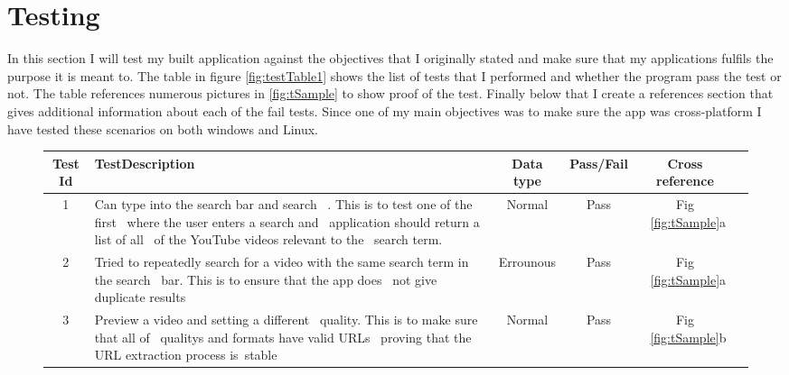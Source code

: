 \documentclass{article}
\begin{document}
\section{Testing}
In this section I will test my built application against the objectives that I originally stated and make sure
that my applications fulfils the purpose it is meant to. The table in figure \ref{fig:testTable1} shows the list
of tests that I performed and whether the program pass the test or not. The table references numerous pictures
in \ref{fig:tSample} to show proof of the test. Finally below that I create a references section that gives
additional information about each of the fail tests. Since one of my main objectives was to make sure the app
was cross-platform I have tested these scenarios on both windows and Linux.
\begin{figure}[H]
    \begin{center}
        \begin{tabular} { | c | p{5cm} | c | c | c | c |}
            \hline
            \textbf{Test Id}&         \textbf{TestDescription}         &   \textbf{Data type}   &\textbf{Pass/Fail}& \textbf{Cross reference}\\ \hline
            1               &Can type into the search bar and search   \
                             . This is to test one of the first        \
                             where the user enters a search and        \
                             application should return a list of all   \
                             of the YouTube videos relevant to the     \
                             search term.                              &      Normal            &       Pass       & Fig ~\ref{fig:tSample}a \\ \hline
            2               &Tried to repeatedly search for a video
                             with the same search term in the search   \
                             bar. This is to ensure that the app does  \
                             not give duplicate results                &      Errounous         &       Pass       & Fig ~\ref{fig:tSample}a \\ \hline
            3               &Preview a video and setting a different   \
                             quality. This is to make sure that all of \
                             qualitys and formats have valid URLs      \
                             proving that the URL extraction process is\
                             stable                                    &      Normal            &       Pass       & Fig ~\ref{fig:tSample}b \\ \hline

\end{tabular}
\end{center}
\end{figure}
\end{document}
